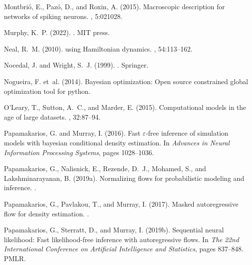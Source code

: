 \documentclass[12pt]{article}
\begin{document}
\begin{thebibliography}{}
Montbri\'o, E., Paz\'o, D., and Roxin, A. (2015).
\newblock Macroscopic description for networks of spiking neurons.
, 5:021028.

Murphy, K.~P. (2022).
.
\newblock MIT press.

Neal, R.~M. (2010).
 using {Hamiltonian} dynamics.
, 54:113--162.

Nocedal, J. and Wright, S.~J. (1999).
.
\newblock Springer.

Nogueira, F. et~al. (2014).
\newblock Bayesian optimization: Open source constrained global optimization
  tool for python.

O'Leary, T., Sutton, A.~C., and Marder, E. (2015).
\newblock Computational models in the age of large datasets.
, 32:87--94.

Papamakarios, G. and Murray, I. (2016).
\newblock Fast $\varepsilon$-free inference of simulation models with bayesian
  conditional density estimation.
\newblock In {\em Advances in Neural Information Processing Systems}, pages
  1028--1036.

Papamakarios, G., Nalisnick, E., Rezende, D.~J., Mohamed, S., and
  Lakshminarayanan, B. (2019a).
\newblock Normalizing flows for probabilistic modeling and inference.
.

Papamakarios, G., Pavlakou, T., and Murray, I. (2017).
\newblock Masked autoregressive flow for density estimation.
.

Papamakarios, G., Sterratt, D., and Murray, I. (2019b).
\newblock Sequential neural likelihood: Fast likelihood-free inference with
  autoregressive flows.
\newblock In {\em The 22nd International Conference on Artificial Intelligence
  and Statistics}, pages 837--848. PMLR.


\end{thebibliography}
\end{document}
